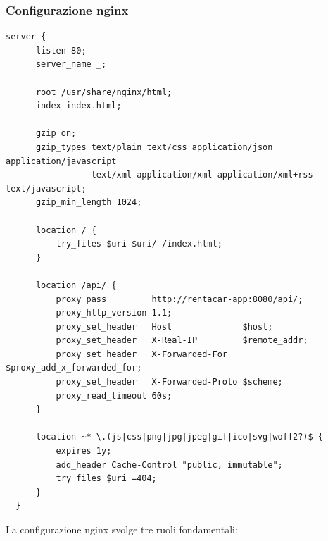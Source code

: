 \documentclass[12pt, a4paper]{article}
\begin{document}
    \subsubsection{Configurazione nginx}

    \begin{lstlisting}[language={}, caption={nginx.conf — configurazione del server frontend}]
  server {
      listen 80;
      server_name _;

      root /usr/share/nginx/html;
      index index.html;

      gzip on;
      gzip_types text/plain text/css application/json application/javascript
                 text/xml application/xml application/xml+rss text/javascript;
      gzip_min_length 1024;

      location / {
          try_files $uri $uri/ /index.html;
      }

      location /api/ {
          proxy_pass         http://rentacar-app:8080/api/;
          proxy_http_version 1.1;
          proxy_set_header   Host              $host;
          proxy_set_header   X-Real-IP         $remote_addr;
          proxy_set_header   X-Forwarded-For   $proxy_add_x_forwarded_for;
          proxy_set_header   X-Forwarded-Proto $scheme;
          proxy_read_timeout 60s;
      }

      location ~* \.(js|css|png|jpg|jpeg|gif|ico|svg|woff2?)$ {
          expires 1y;
          add_header Cache-Control "public, immutable";
          try_files $uri =404;
      }
  }
    \end{lstlisting}

    La configurazione nginx svolge tre ruoli fondamentali:
\end{document}
